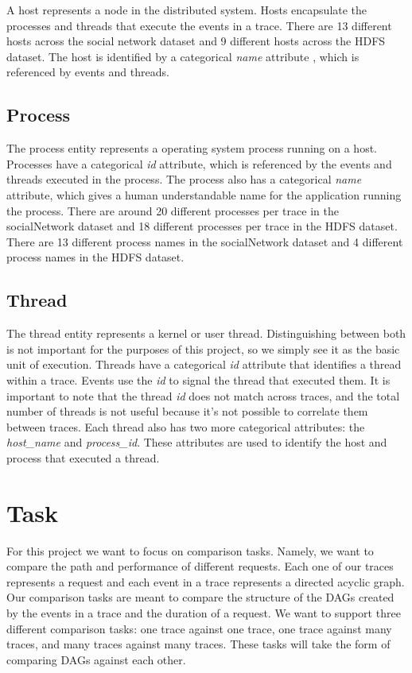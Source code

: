 \documentclass{article}
\begin{document}
A host represents a node in the distributed system. Hosts encapsulate the processes and threads
that execute the events in a trace. There are 13 different hosts across the social network dataset
and 9 different hosts across the HDFS dataset. The host is identified by a categorical \textit{name} attribute , which is
referenced by events and threads.

\subsection{Process}

The process entity represents a operating system process running on
a host. Processes have a categorical \textit{id} attribute, which is referenced by the events and threads executed in
the process. The process also has a categorical \textit{name} attribute, which gives a human understandable name for the
application running the process. There are around 20 different processes per trace in the socialNetwork
dataset and 18 different processes per trace in the HDFS dataset. There are 13 different process names
in the socialNetwork dataset and 4 different process names in the HDFS dataset.

\subsection{Thread}

The thread entity represents
a kernel or user thread. Distinguishing between both is not important for the purposes of this project, so we
simply see it as the basic unit of execution. Threads have a categorical \textit{id} attribute that identifies a thread
within a trace. Events use the \textit{id} to signal the thread that executed them. It is important to note
that the thread \textit{id} does not match across traces, and the total number of threads is not useful because it's
not possible to correlate them between traces. Each thread also has two more categorical attributes: the \textit{host\_name}
and \textit{process\_id}. These attributes are used to identify the host and process that executed a thread. 

\section{Task}

For this project we want to focus on comparison tasks. Namely, we want to compare the path and performance of different
requests. Each one of our traces represents a request and each event in a trace represents a directed acyclic graph. Our
comparison tasks are meant to compare the structure of the DAGs created by the events in a trace and the duration of a request. 
We want to support three different comparison tasks: one trace against one trace, one trace against many traces, and many traces
against many traces. These tasks will take the form of comparing DAGs against each other.  
\end{document}
